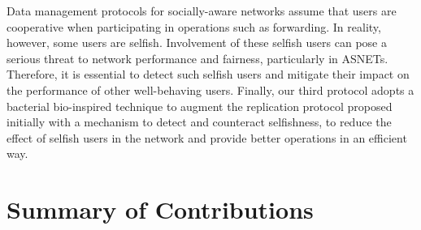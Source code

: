 Data management protocols for socially-aware networks assume that users are cooperative when participating in operations such as forwarding. In reality, however, some users are selfish.  Involvement of these selfish users can pose a serious threat to network performance and fairness, particularly in ASNETs. Therefore, it is essential to detect such selfish users and mitigate their impact on the performance of other well-behaving users. Finally, our third protocol adopts a bacterial bio-inspired technique to augment the replication protocol proposed initially with a mechanism to detect and counteract selfishness, to reduce the effect of selfish users in the network and provide better operations in an efficient way.

\section{Summary of Contributions}\label{Chap1_02}

